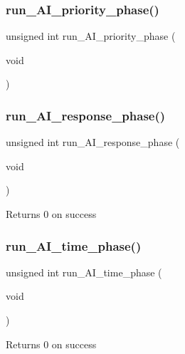 \subsubsection{\texorpdfstring{run\+\_\+\+A\+I\+\_\+priority\+\_\+phase()}{run\_AI\_priority\_phase()}}
{\footnotesize\ttfamily unsigned int run\+\_\+\+A\+I\+\_\+priority\+\_\+phase (\begin{DoxyParamCaption}\item[{void}]{ }\end{DoxyParamCaption})}

\mbox{\label{group__phase__functions_ga0a0b5f5f0651f624b53940e999c7cbb9}} 
\subsubsection{\texorpdfstring{run\+\_\+\+A\+I\+\_\+response\+\_\+phase()}{run\_AI\_response\_phase()}}
{\footnotesize\ttfamily unsigned int run\+\_\+\+A\+I\+\_\+response\+\_\+phase (\begin{DoxyParamCaption}\item[{void}]{ }\end{DoxyParamCaption})}

\begin{DoxyReturn}{Returns}
0 on success 
\end{DoxyReturn}
\mbox{\label{group__phase__functions_ga03f61084843501f07105ba840b4ca344}} 
\subsubsection{\texorpdfstring{run\+\_\+\+A\+I\+\_\+time\+\_\+phase()}{run\_AI\_time\_phase()}}
{\footnotesize\ttfamily unsigned int run\+\_\+\+A\+I\+\_\+time\+\_\+phase (\begin{DoxyParamCaption}\item[{void}]{ }\end{DoxyParamCaption})}

\begin{DoxyReturn}{Returns}
0 on success 
\end{DoxyReturn}
